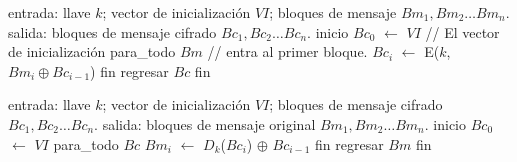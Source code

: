 \begin{pseudocodigo}[%
    caption={\Gls{gl:modo_de_operacion} \gls{gl:cbc}, cifrado.},
    label={cbc:1}%
  ]
  entrada: llave $ k $; vector de inicialización $ VI $;
           bloques de mensaje $ Bm_1, Bm_2 \dots Bm_n $.
  salida:  bloques de mensaje cifrado $ Bc_1, Bc_2 \dots Bc_n $.
  inicio
    $Bc_0$ $\gets$ $ VI $                        // El vector de inicialización
    para_todo $Bm$               // entra al primer bloque.
      $Bc_i$ $\gets$ E($k$, $Bm_i \oplus Bc_{i - 1}$)
    fin
    regresar $Bc$
  fin
\end{pseudocodigo}

\begin{pseudocodigo}[%
    caption={\Gls{gl:modo_de_operacion} \gls{gl:cbc}, descifrado.},
    label={cbc:2}%
  ]
  entrada: llave $ k $; vector de inicialización $ VI $;
           bloques de mensaje cifrado $ Bc_1, Bc_2 \dots Bc_n $.
  salida:  bloques de mensaje original $ Bm_1, Bm_2 \dots Bm_n $.
  inicio
    $Bc_0$ $\gets$ $ VI $
    para_todo $Bc$
      $Bm_i$ $\gets$ $D_k$($Bc_i$) $\oplus$ $Bc_{i-1}$
    fin
    regresar $Bm$
  fin
\end{pseudocodigo}

